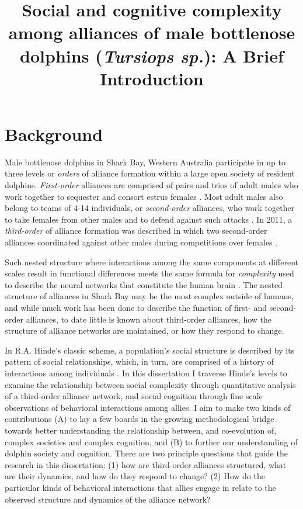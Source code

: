 \documentclass[11pt]{amsart}
\title[Social and cognitive complexity among alliances of male bottlenose dolphins (\emph{Tursiops sp.})]{Social and cognitive complexity among alliances of male bottlenose dolphins (\emph{Tursiops sp.}): A Brief Introduction}
\date{}
\begin{document}
\maketitle

\section{Background}

Male bottlenose dolphins in Shark Bay, Western Australia participate in up to three levels or \textit{orders} of alliance formation within a large open society of resident dolphins. \textit{First-order} alliances are comprised of pairs and trios of adult males who work together to sequester and consort estrus females \citep{connor:1992a}. Most adult males also belong to teams of 4-14 individuals, or \textit{second-order} alliances, who work together to take females from other males and to defend against such attacks \citep{connor:1992a, connor:1992b}. In 2011, a \textit{third-order} of alliance formation was described in which two second-order alliances coordinated against other males during competitions over females \citep{connor:2011}. 

Such nested structure where interactions among the same components at different scales result in functional differences meets the same formula for \textit{complexity} used to describe the neural networks that constitute the human brain \citep{tononi:1994}. The nested structure of alliances in Shark Bay may be the most complex outside of humans, and while much work has been done to describe the function of first- and second-order alliances, to date little is known about third-order alliances, how the structure of alliance networks are maintained, or how they respond to change.

In R.A. Hinde's classic scheme, a population's social structure is described by its pattern of social relationships, which, in turn, are comprised of a history of interactions among individuals \citep{hinde:1976}. In this dissertation I traverse Hinde's levels to examine the relationship between social complexity through quantitative analysis of a third-order alliance network, and social cognition through fine scale observations of behavioral interactions among allies. I aim to make two kinds of contributions (A) to lay a few boards in the growing methodological bridge towards better understanding the relationship between, and co-evolution of, complex societies and complex cognition, and (B) to further our understanding of dolphin society and cognition. There are two principle questions that guide the research in this dissertation: (1) how are third-order alliances structured, what are their dynamics, and how do they respond to change? (2) How do the particular kinds of behavioral interactions that allies engage in relate to the observed structure and dynamics of the alliance network?
\end{document}
